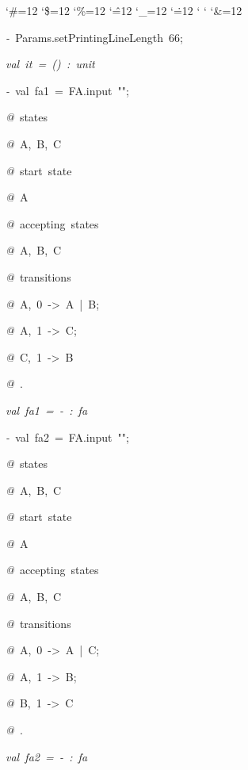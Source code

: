 \begin{list}{}
{\setlength{\leftmargin}{\leftmargini}
\setlength{\rightmargin}{0cm}
\setlength{\itemindent}{0cm}
\setlength{\listparindent}{0cm}
\setlength{\itemsep}{0cm}
\setlength{\parsep}{0cm}
\setlength{\labelsep}{0cm}
\setlength{\labelwidth}{0cm}
\catcode`\#=12
\catcode`\$=12
\catcode`\%=12
\catcode`\^=12
\catcode`\_=12
\catcode`\.=12
\catcode`
\catcode`
\catcode`\&=12
\ttfamily}
\small
\item[]\textsl{-\ }Params.setPrintingLineLength\ 66;
\item[]\textsl{val\ it\ =\ ()\ :\ unit}
\item[]\textsl{-\ }val\ fa1\ =\ FA.input\ "";
\item[]\textsl{@\ }states
\item[]\textsl{@\ }A,\ B,\ C
\item[]\textsl{@\ }start\ state
\item[]\textsl{@\ }A
\item[]\textsl{@\ }accepting\ states
\item[]\textsl{@\ }A,\ B,\ C
\item[]\textsl{@\ }transitions
\item[]\textsl{@\ }A,\ 0\ ->\ A\ |\ B;
\item[]\textsl{@\ }A,\ 1\ ->\ C;
\item[]\textsl{@\ }C,\ 1\ ->\ B
\item[]\textsl{@\ }.
\item[]\textsl{val\ fa1\ =\ -\ :\ fa}
\item[]\textsl{-\ }val\ fa2\ =\ FA.input\ "";
\item[]\textsl{@\ }states
\item[]\textsl{@\ }A,\ B,\ C
\item[]\textsl{@\ }start\ state
\item[]\textsl{@\ }A
\item[]\textsl{@\ }accepting\ states
\item[]\textsl{@\ }A,\ B,\ C
\item[]\textsl{@\ }transitions
\item[]\textsl{@\ }A,\ 0\ ->\ A\ |\ C;
\item[]\textsl{@\ }A,\ 1\ ->\ B;
\item[]\textsl{@\ }B,\ 1\ ->\ C
\item[]\textsl{@\ }.
\item[]\textsl{val\ fa2\ =\ -\ :\ fa}
\end{list}
